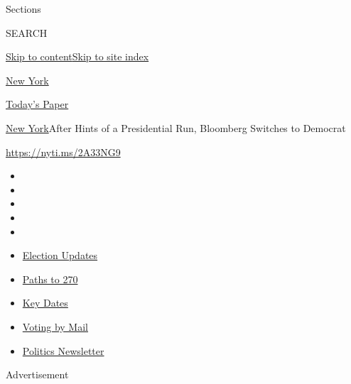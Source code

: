 Sections

SEARCH

\protect\hyperlink{site-content}{Skip to
content}\protect\hyperlink{site-index}{Skip to site index}

\href{https://www.nytimes3xbfgragh.onion/section/nyregion}{New York}

\href{https://myaccount.nytimes3xbfgragh.onion/auth/login?response_type=cookie\&client_id=vi}{}

\href{https://www.nytimes3xbfgragh.onion/section/todayspaper}{Today's
Paper}

\href{/section/nyregion}{New York}\textbar{}After Hints of a
Presidential Run, Bloomberg Switches to Democrat

\url{https://nyti.ms/2A33NG9}

\begin{itemize}
\item
\item
\item
\item
\item
\end{itemize}

\begin{itemize}
\item
  \href{https://www.nytimes3xbfgragh.onion/live/2020/09/11/us/trump-vs-biden?action=click\&pgtype=Article\&state=default\&region=TOP_BANNER\&context=storylines_menu}{Election
  Updates}
\item
  \href{https://www.nytimes3xbfgragh.onion/interactive/2020/us/elections/election-states-biden-trump.html?action=click\&pgtype=Article\&state=default\&region=TOP_BANNER\&context=storylines_menu}{Paths
  to 270}
\item
  \href{https://www.nytimes3xbfgragh.onion/interactive/2019/us/elections/2020-presidential-election-calendar.html?action=click\&pgtype=Article\&state=default\&region=TOP_BANNER\&context=storylines_menu}{Key
  Dates}
\item
  \href{https://www.nytimes3xbfgragh.onion/interactive/2020/08/31/us/politics/vote-by-mail-deadlines.html?action=click\&pgtype=Article\&state=default\&region=TOP_BANNER\&context=storylines_menu}{Voting
  by Mail}
\item
  \href{https://www.nytimes3xbfgragh.onion/newsletters/politics?action=click\&pgtype=Article\&state=default\&region=TOP_BANNER\&context=storylines_menu}{Politics
  Newsletter}
\end{itemize}

Advertisement


